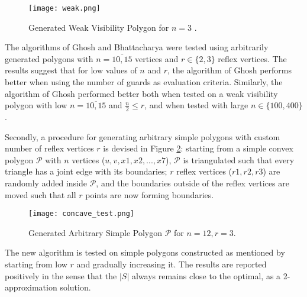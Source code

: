 \begin{figure}[h!]
    \centering
    \texttt{[image: weak.png]}
    \caption{Generated Weak Visibility Polygon for $n = 3$ \cite{maleki2022implementation}.}
    \label{fig:weak}
\end{figure}

The algorithms of Ghosh \cite{GHOSH2010718} and Bhattacharya \cite{bhattacharya2016approximability} were tested using arbitrarily generated polygons with $n = \overline{10, 15}$ vertices and $r \in \{2, 3\}$ reflex vertices. The results suggest that for low values of $n$ and $r$, the algorithm of Ghosh \cite{GHOSH2010718} performs better when using the number of guards as evaluation criteria. 
Similarly, the algorithm of Ghosh \cite{GHOSH2010718} performed better both when tested on a weak visibility polygon with low $n = \overline{10, 15}$ and $\frac n 2 \leq r$, and when tested with large $n \in \{100, 400\}$.

Secondly, a procedure for generating arbitrary simple polygons with custom number of reflex vertices $r$ is devised in Figure \ref{fig:arbitrary}: starting from a simple convex polygon $\mathcal P$ with $n$ vertices ($u, v, x1, x2, ..., x7$), $\mathcal P$ is triangulated such that every triangle has a joint edge with its boundaries; $r$ reflex vertices ($r1, r2, r3$) are randomly added inside $\mathcal P$, and the boundaries outside of the reflex vertices are moved such that all $r$ points are now forming boundaries. 

\begin{figure}[h!]
    \centering
    \texttt{[image: concave\_test.png]}
    \caption{Generated Arbitrary Simple Polygon $\mathcal P$ for $n = 12, r = 3$.}
    \label{fig:arbitrary}
\end{figure}

The new algorithm is tested on simple polygons constructed as mentioned by starting from low $r$ and gradually increasing it. The results are reported positively in the sense that the $|S|$ always remains close to the optimal, as a 2-approximation solution.


